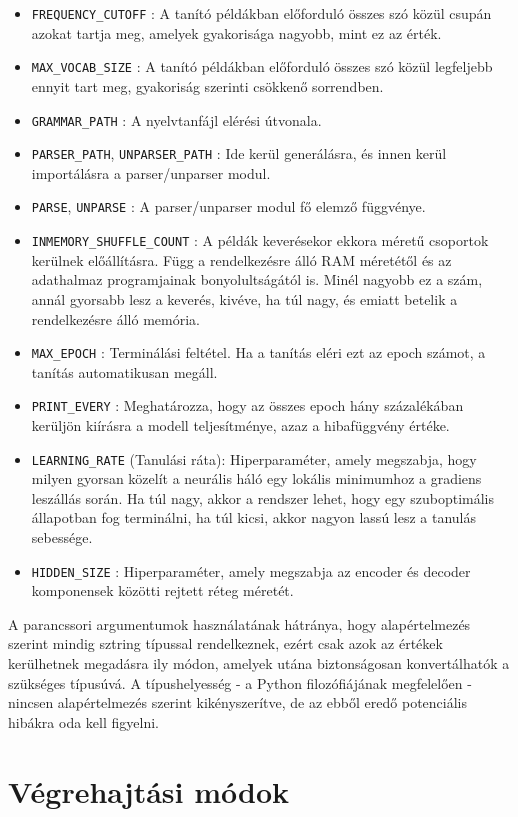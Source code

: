 \documentclass[twoside, 12pt]{report}
\begin{document}
\begin{itemize}[noitemsep]
  \item \verb|FREQUENCY_CUTOFF| : A tanító példákban előforduló összes szó közül csupán azokat tartja meg, amelyek gyakorisága nagyobb, mint ez az érték.
  \item \verb|MAX_VOCAB_SIZE| : A tanító példákban előforduló összes szó közül legfeljebb ennyit tart meg, gyakoriság szerinti csökkenő sorrendben.
  \item \verb|GRAMMAR_PATH| : A nyelvtanfájl elérési útvonala.
  \item \verb|PARSER_PATH|, \verb|UNPARSER_PATH| : Ide kerül generálásra, és innen kerül importálásra a parser/unparser modul.
  \item \verb|PARSE|, \verb|UNPARSE| : A parser/unparser modul fő elemző függvénye.
  \item \verb|INMEMORY_SHUFFLE_COUNT| : A példák keverésekor ekkora méretű csoportok kerülnek előállításra. Függ a rendelkezésre álló RAM méretétől és az adathalmaz programjainak bonyolultságától is. Minél nagyobb ez a szám, annál gyorsabb lesz a keverés, kivéve, ha túl nagy, és emiatt betelik a rendelkezésre álló memória.
  \item \verb|MAX_EPOCH| : Terminálási feltétel. Ha a tanítás eléri ezt az epoch számot, a tanítás automatikusan megáll.
  \item \verb|PRINT_EVERY| : Meghatározza, hogy az összes epoch hány százalékában kerüljön kiírásra a modell teljesítménye, azaz a hibafüggvény értéke.
  \item \verb|LEARNING_RATE| (Tanulási ráta): Hiperparaméter, amely megszabja, hogy milyen gyorsan közelít a neurális háló egy lokális minimumhoz a gradiens leszállás során. Ha túl nagy, akkor a rendszer lehet, hogy egy szuboptimális állapotban fog terminálni, ha túl kicsi, akkor nagyon lassú lesz a tanulás sebessége.
  \item \verb|HIDDEN_SIZE| : Hiperparaméter, amely megszabja az encoder és decoder komponensek közötti rejtett réteg méretét.
\end{itemize}

A parancssori argumentumok használatának hátránya, hogy alapértelmezés szerint mindig sztring típussal rendelkeznek, ezért csak azok az értékek kerülhetnek megadásra ily módon, amelyek utána biztonságosan konvertálhatók a szükséges típusúvá. A típushelyesség - a Python filozófiájának megfelelően - nincsen alapértelmezés szerint kikényszerítve, de az ebből eredő potenciális hibákra oda kell figyelni.

\section{Végrehajtási módok}
\end{document}
